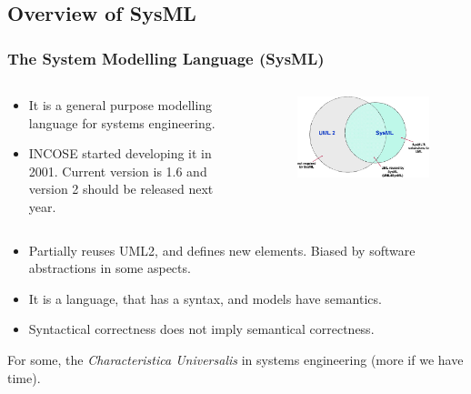 \documentclass[xcolor=dvipsnames,t]{beamer}
\begin{document}
\subsection{Overview of SysML}
\begin{frame}
\frametitle {The System Modelling Language (SysML)}
\vspace{-0.5cm}
     \begin{columns}
    \begin{column}{0.55\textwidth}
\vspace{0.5cm}
        \begin{itemize}
            \item It is a general purpose modelling language for systems engineering.
            \item INCOSE started developing it in 2001. Current version is 1.6 and version 2 should be released next year.

         \end{itemize}
     \end{column}
     
    \begin{column}{0.45\textwidth}
        \begin{figure}
            \includegraphics[width=.9\textwidth]{SysMLsuperset.jpg}
	\end{figure}
     \end{column}
     \end{columns}

\vspace{0.5cm}
\begin{itemize}
            \item Partially reuses UML2, and defines new elements. Biased by software abstractions in some aspects.
            \item It is a language, that has a syntax, and models have semantics.
            \item Syntactical correctness does not imply semantical correctness.
\end{itemize}
\vspace{0.5cm}
For some, the \textit{Characteristica Universalis} in systems engineering (more if we have time).
\end{frame} 
\end{document}
